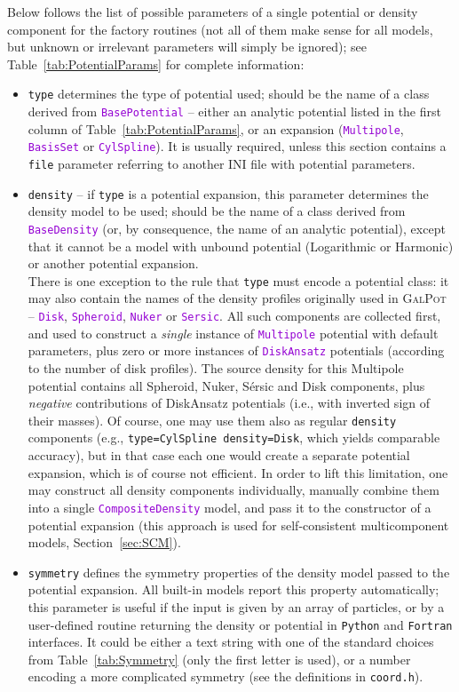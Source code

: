 \documentclass[12pt]{article}
\newcommand{\Python}{\texttt{Python}\xspace}
\newcommand{\Fortran}{\texttt{Fortran}\xspace}
\newcommand{\ttt}[1]{\textcolor{darkviolet}{\texttt{#1}}}
\newcommand{\ppp}[1]{\textcolor{darkolive} {\texttt{#1}}}
\begin{document}
Below follows the list of possible parameters of a single potential or density component for the factory routines (not all of them make sense for all models, but unknown or irrelevant parameters will simply be ignored); see Table~\ref{tab:PotentialParams} for complete information:
\begin{itemize}
\item \ppp{type}  determines the type of potential used; should be the name of a class derived from \ttt{BasePotential} -- either an analytic potential listed in the first column of Table~\ref{tab:PotentialParams}, or an expansion (\ttt{Multipole}, \ttt{BasisSet} or \ttt{CylSpline}). It is usually required, unless this section contains a \ppp{file} parameter referring to another INI file with potential parameters.
\item  \ppp{density} -- if \ppp{type} is a potential expansion, this parameter determines the density model to be used; should be the name of a class derived from \ttt{BaseDensity} (or, by consequence, the name of an analytic potential), except that it cannot be a model with unbound potential (Logarithmic or Harmonic) or another potential expansion.\\
\label{sec:PotentialGalpot}%
There is one exception to the rule that \ppp{type} must encode a potential class: it may also contain the names of the density profiles originally used in \textsc{GalPot} -- \ttt{Disk}, \ttt{Spheroid}, \ttt{Nuker} or \ttt{Sersic}. All such components are collected first, and used to construct a \textit{single} instance of \ttt{Multipole} potential with default parameters, plus zero or more instances of \ttt{DiskAnsatz} potentials (according to the number of disk profiles). The source density for this Multipole potential contains all Spheroid, Nuker, S\'ersic and Disk components, plus \textit{negative} contributions of DiskAnsatz potentials (i.e., with inverted sign of their masses). Of course, one may use them also as regular \ppp{density} components (e.g., \ppp{type=CylSpline density=Disk}, which yields comparable accuracy), but in that case each one would create a separate potential expansion, which is of course not efficient. In order to lift this limitation, one may construct all density components individually, manually combine them into a single \ttt{CompositeDensity} model, and pass it to the constructor of a potential expansion (this approach is used for self-consistent multicomponent models, Section~\ref{sec:SCM}).
\item \ppp{symmetry}  defines the symmetry properties of the density model passed to the potential expansion. All built-in models report this property automatically; this parameter is useful if the input is given by an array of particles, or by a user-defined routine returning the density or potential in \Python and \Fortran interfaces. It could be either a text string with one of the standard choices from Table~\ref{tab:Symmetry} (only the first letter is used), or a number encoding a more complicated symmetry (see the definitions in \texttt{coord.h}).

\end{itemize}
\end{document}

